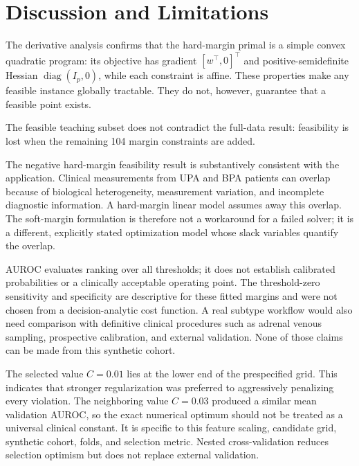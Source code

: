 \documentclass[11pt,a4paper]{article}
\numberwithin{equation}{section} %
\begin{document}
\section{Discussion and Limitations}

The derivative analysis confirms that the hard-margin primal is a simple convex quadratic program: its objective has gradient $[w^\top,0]^\top$ and positive-semidefinite Hessian $\operatorname{diag}(I_p,0)$, while each constraint is affine. These properties make any feasible instance globally tractable. They do not, however, guarantee that a feasible point exists.

The feasible teaching subset does not contradict the full-data result: feasibility is lost when the remaining 104 margin constraints are added.

The negative hard-margin feasibility result is substantively consistent with
the application. Clinical measurements from UPA and BPA patients can overlap
because of biological heterogeneity, measurement variation, and incomplete
diagnostic information. A hard-margin linear model assumes away this overlap.
The soft-margin formulation is therefore not a workaround for a failed
solver; it is a different, explicitly stated optimization model whose slack
variables quantify the overlap.

AUROC evaluates ranking over all thresholds; it does not establish calibrated
probabilities or a clinically acceptable operating point. The threshold-zero
sensitivity and specificity are descriptive for these fitted margins and were
not chosen from a decision-analytic cost function. A real subtype workflow
would also need comparison with definitive clinical procedures such as adrenal
venous sampling, prospective calibration, and external validation. None of
those claims can be made from this synthetic cohort.

The selected value $C=0.01$ lies at the lower end of the prespecified grid.
This indicates that stronger regularization was preferred to aggressively
penalizing every violation. The neighboring value $C=0.03$ produced a similar
mean validation AUROC, so the exact numerical optimum should not be treated as
a universal clinical constant. It is specific to this feature scaling,
candidate grid, synthetic cohort, folds, and selection metric. Nested
cross-validation reduces selection optimism but does not replace external
validation.
\end{document}
